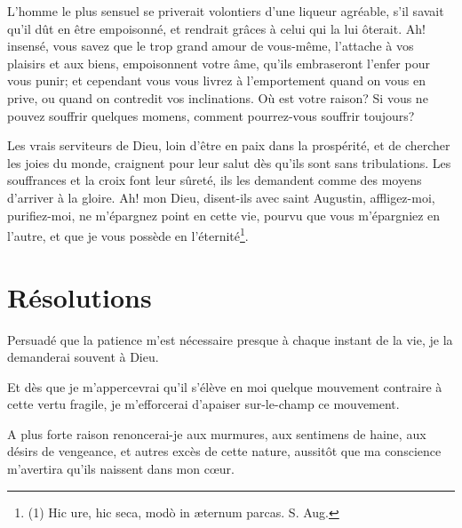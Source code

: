 \documentclass[instructions.tex]{subfiles}
\begin{document}
L'homme le plus sensuel se priverait volontiers d'une liqueur agréable, s'il savait qu'il dût en être empoisonné, et rendrait grâces à celui qui la lui ôterait. Ah! insensé, vous savez que le trop grand amour de vous-même, l'attache à vos plaisirs et aux biens, empoisonnent votre âme, qu'ils embraseront l'enfer pour vous punir; et cependant vous vous livrez à l'emportement quand on vous en prive, ou quand on contredit vos inclinations. Où est votre raison? Si vous ne pouvez souffrir quelques momens, comment pourrez-vous souffrir toujours?
 
Les vrais serviteurs de Dieu, loin d'être en paix dans la prospérité, et de chercher les joies du monde, craignent pour leur salut dès qu'ils sont sans tribulations. Les souffrances et la croix font leur sûreté, ils les demandent comme des moyens d'arriver à la gloire. Ah! mon Dieu, disent-ils avec saint Augustin, affligez-moi, purifiez-moi, ne m'épargnez point en cette vie, pourvu que vous m'épargniez en l'autre, et que je vous possède en l'éternité\footnote{(1) Hic ure, hic seca, modò in æternum parcas. S. Aug.}.
 
\section{Résolutions}
 
\primo Persuadé que la patience m'est nécessaire presque à chaque instant de la vie, je la demanderai souvent à Dieu.
 
\secundo Et dès que je m'appercevrai qu'il s'élève en moi quelque mouvement contraire à cette vertu fragile, je m'efforcerai d'apaiser sur-le-champ ce mouvement.
 
\tertio A plus forte raison renoncerai-je aux murmures, aux sentimens de haine, aux désirs de vengeance, et autres excès de cette nature, aussitôt que ma conscience m'avertira qu'ils naissent dans mon cœur. 

 
\end{document}
